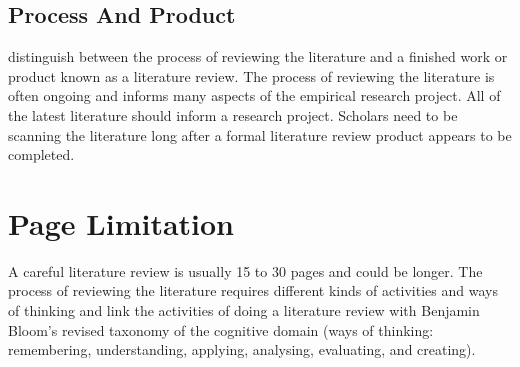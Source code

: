 \subsection{Process And Product}
\cite{gilbarg2015elliptic} distinguish between the process of reviewing the literature and a finished work or product known as a literature review. The process of reviewing the literature is often ongoing and informs many aspects of the empirical research project. All of the latest literature should inform a research project. Scholars need to be scanning the literature long after a formal literature review product appears to be completed.

\section{Page Limitation}
A careful literature review is usually 15 to 30 pages and could be longer. The process of reviewing the literature requires different kinds of activities and ways of thinking \citep{duzdevich2014dna} and \cite{kothari2004research} link the activities of doing a literature review with Benjamin Bloom’s revised taxonomy of the cognitive domain (ways of thinking: remembering, understanding, applying, analysing, evaluating, and creating).